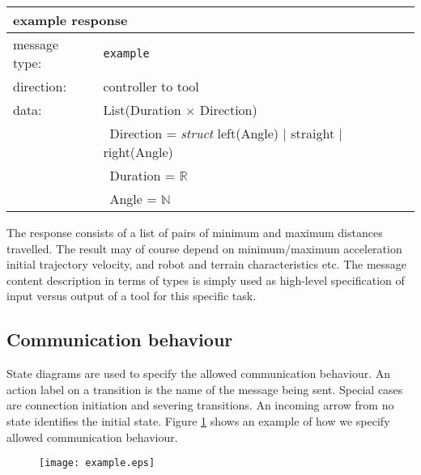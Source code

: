 \documentclass{article}
\newcommand{\msg}[1]{\texttt{#1}}
\begin{document}
   \begin{table}[H]
    \begin{center}
     \begin{tabular}{|ll|}
      \hline
       \multicolumn{2}{|l|}{\textbf{example response}} \\
      \hline
       message type:    & \msg{example} \\
      \hline
       direction:       & controller to tool \\
      \hline
       data:            & List(Duration $\times$ Direction) \\
                        & \ Direction = \textit{struct } left(Angle) $|$ straight $|$ right(Angle) \\
                        & \ Duration  = $\mathbb{R}$ \\
                        & \ Angle     = $\mathbb{N}$ \\
      \hline
     \end{tabular}
    \end{center}
    \vspace{-0.5cm}
   \end{table}

   \noindent The response consists of a list of pairs of minimum and maximum
   distances travelled. The result may of course depend on minimum/maximum
   acceleration initial trajectory velocity, and robot and terrain
   characteristics etc. The message content description in terms of types is
   simply used as high-level specification of input versus output of a tool for
   this specific task.

  \subsection{Communication behaviour}

   State diagrams are used to specify the allowed communication behaviour. An
   action label on a transition is the name of the message being sent. Special
   cases are connection initiation and severing transitions.  An incoming arrow
   from no state identifies the initial state. Figure
   \ref{figure:process_example} shows an example of how we specify allowed
   communication behaviour.

   \begin{figure}[H]
    \vspace{-0.3cm}
    \begin{center}
     \texttt{[image: example.eps]}
    \end{center}
    \vspace{-0.5cm}
    \label{figure:process_example}
    \vspace{-0.2cm}
   \end{figure}
\end{document}
